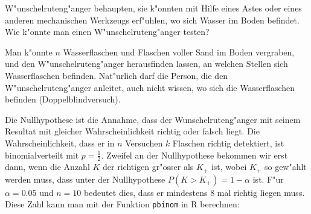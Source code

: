W"unschelruteng"anger behaupten, sie k"onnten mit Hilfe eines Astes
oder eines anderen mechanischen Werkzeugs erf"uhlen, wo sich Wasser
im Boden befindet. Wie k"onnte man einen W"unschelruteng"anger testen?

\begin{loesung}
Man k"onnte $n$ Wasserflaschen und Flaschen voller Sand im Boden vergraben,
und den W"unschelruteng"anger herausfinden lassen, an welchen Stellen
sich Wasserflaschen befinden. Nat"urlich darf die Person, die den
W"unschelruteng"anger anleitet, auch nicht wissen, wo sich die
Wasserflaschen befinden (Doppelblindversuch).

Die Nullhypothese ist die Annahme, dass der Wunschelruteng"anger mit
seinem Resultat mit
gleicher Wahrscheinlichkeit richtig oder falsch liegt.
Die Wahrscheinlichkeit, dass er  in $n$ Versuchen
$k$ Flaschen richtig detektiert, ist
binomialverteilt mit $p=\frac12$.
Zweifel an der Nullhypothese bekommen wir erst
dann, wenn die Anzahl $K$ der richtigen gr"osser als $K_+$ ist, wobei
$K_+$ so gew"ahlt werden muss, dass unter der Nullhypothese
$P(K>K_+)=1-\alpha$ ist. F"ur $\alpha=0.05$ und $n=10$ bedeutet
dies, dass er mindestens 8 mal richtig liegen muss. Diese Zahl
kann man mit der Funktion {\tt pbinom} in R berechnen:
\end{loesung}

